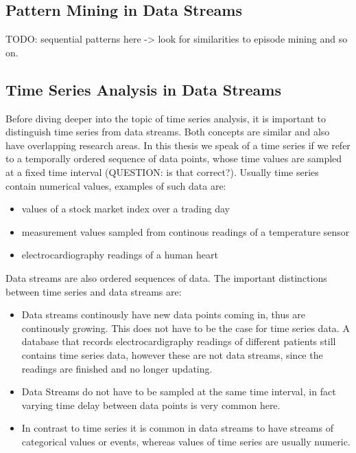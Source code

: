 \subsection{Pattern Mining in Data Streams}
\label{subsec_PatternMining}

TODO: sequential patterns here -> look for similarities to episode mining and so on.

\subsection{Time Series Analysis in Data Streams}
\label{subsec_timeSeriesAnalysis}
Before diving deeper into the topic of time series analysis, it is important to distinguish time series from data streams. Both concepts are similar and also have overlapping research areas. In this thesis we speak of a time series if we refer to a temporally ordered sequence of data points, whose time values are sampled at a fixed time interval (QUESTION: is that correct?). Usually time series contain numerical values, examples of such data are:

\begin{itemize}
	\item values of a stock market index over a trading day
	\item measurement values sampled from continous readings of a temperature sensor
	\item electrocardiography readings of a human heart
\end{itemize}

Data streams are also ordered sequences of data. The important distinctions between time series and data streams are: 

\begin{itemize}
	\item Data streams continously have new data points coming in, thus are continously growing. This does not have to be the case for time series data. A database that records electrocardigraphy readings of different patients still contains time series data, however these are not data streams, since the readings are finished and no longer updating.
	\item Data Streams do not have to be sampled at the same time interval, in fact varying time delay between data points is very common here.
	\item In contrast to time series it is common in data streams to have streams of categorical values or events, whereas values of time series are usually numeric.
\end{itemize}

